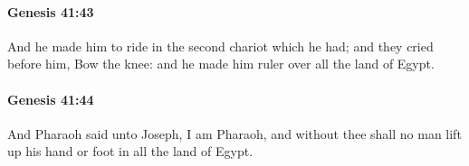 		\paragraph{Genesis 41:43} %
			\label{GENESIS-41-43}

			And he made him to ride in the second chariot which he had; and they cried before him, Bow the knee: and he made him ruler over all the land of Egypt.


		\paragraph{Genesis 41:44} %
			\label{GENESIS-41-44}

			And Pharaoh said unto Joseph, I am Pharaoh, and without thee shall no man lift up his hand or foot in all the land of Egypt.


